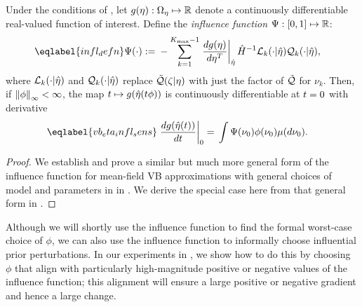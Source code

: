 %
\begin{cor}
%
Under the conditions of ,
let $g(\eta): \Omega_{\eta} \mapsto \mathbb{R}$ denote a
continuously differentiable real-valued function of interest.  Define the
\emph{influence function} $\Psi: [0,1] \mapsto \mathbb{R}$:
%
\begin{align} \eqlabel{infl_defn}
%
\infl(\cdot) :={}&
    - \sum_{k=1}^{\kmax-1} \fracat{d g(\eta)}{ d \eta^T}{\etaopt} \hessopt^{-1}
        \lqgradbark{\cdot \vert \etaopt}
        \qk(\cdot \vert \etaopt),
%
\end{align}
where $\mathcal{L}_k({\cdot \vert \hat\eta})$ and $\mathcal{Q}_k(\cdot \vert \hat\eta)$
replace $\tilde{\mathcal{Q}}(\zeta \vert \eta)$ with just the factor of $\tilde{\mathcal{Q}}$ for $\nu_k$.
%
Then, if $\left\Vert\phi\right\Vert_{\infty} < \infty$, the map $t \mapsto g(\hat\eta(t \phi))$ is
continuously differentiable at $t=0$ with derivative
%
\begin{align} \eqlabel{vb_eta_infl_sens}
%
\fracat{d g(\etaopt(\t))}{d \t}{0} ={}&
    \int \infl(\nu_0) \phi(\nu_0) \mu(d\nu_0).
%
\end{align}
\end{cor}
%
\begin{proof}
%
%
We establish and prove a similar but much more general form of the influence
function for mean-field VB approximations with general choices of model and
parameters in  in . We
derive the special case here from that general form in .
%
\end{proof}

Although we will shortly use the influence function to find the formal
worst-case choice of $\phi$, we can also use the influence function to
informally choose influential prior perturbations. In our experiments in
, we show how to do this by choosing $\phi$ that align with
particularly high-magnitude positive or negative values of the influence
function; this alignment will ensure a large positive or negative gradient and
hence a large change.

